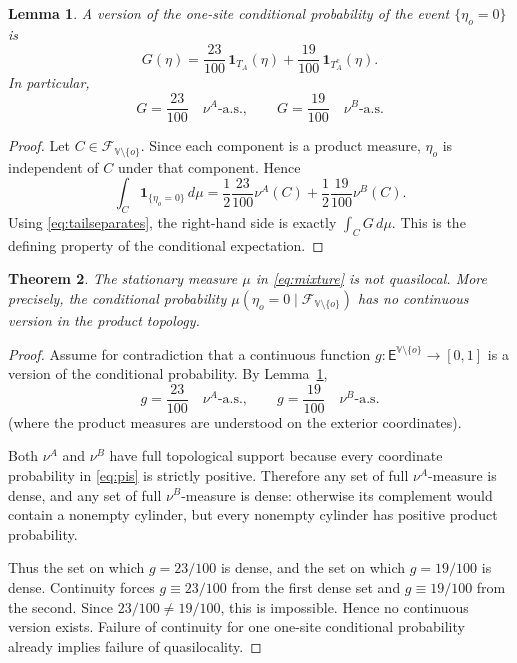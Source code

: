 \documentclass[11pt]{article}
\newtheorem{theorem}{Theorem}
\newtheorem{lemma}[theorem]{Lemma}
\newcommand{\EE}{\mathsf E}
\newcommand{\V}{\mathbb V}
\newcommand{\F}{\mathcal F}
\newcommand{\nuA}{\nu^{A}}
\newcommand{\nuB}{\nu^{B}}
\begin{document}
\begin{lemma}\label{lem:conditional}
A version of the one-site conditional probability of the event $\{\eta_o=0\}$
is
\begin{equation}
 G(\eta)
 =\frac{23}{100}\,\mathbf 1_{T_A}(\eta)
 +\frac{19}{100}\,\mathbf 1_{T_A^c}(\eta).
 \label{eq:conditional}
\end{equation}
In particular,
\[
 G=\frac{23}{100}\quad\nuA\text{-a.s.},
 \qquad
 G=\frac{19}{100}\quad\nuB\text{-a.s.}
\]
\end{lemma}

\begin{proof}
Let $C\in\F_{\V\setminus\{o\}}$.  Since each component is a product measure,
$\eta_o$ is independent of $C$ under that component.  Hence
\[
 \int_C\mathbf 1_{\{\eta_o=0\}}\,d\mu
 =\frac12\frac{23}{100}\nuA(C)
  +\frac12\frac{19}{100}\nuB(C).
\]
Using \eqref{eq:tailseparates}, the right-hand side is exactly
$\int_C G\,d\mu$.  This is the defining property of the conditional
expectation.
\end{proof}

\begin{theorem}\label{thm:nonquasi}
The stationary measure $\mu$ in \eqref{eq:mixture} is not quasilocal.  More
precisely, the conditional probability
$\mu(\eta_o=0\mid\F_{\V\setminus\{o\}})$ has no continuous version in the
product topology.
\end{theorem}

\begin{proof}
Assume for contradiction that a continuous function
$g:\EE^{\V\setminus\{o\}}\to[0,1]$ is a version of the conditional
probability.  By Lemma~\ref{lem:conditional},
\begin{equation}
 g=\frac{23}{100}\quad\nuA\text{-a.s.},
 \qquad
 g=\frac{19}{100}\quad\nuB\text{-a.s.}
 \label{eq:two-values}
\end{equation}
(where the product measures are understood on the exterior coordinates).

Both $\nuA$ and $\nuB$ have full topological support because every coordinate
probability in \eqref{eq:pis} is strictly positive.  Therefore any set of full
$\nuA$-measure is dense, and any set of full $\nuB$-measure is dense: otherwise
its complement would contain a nonempty cylinder, but every nonempty cylinder
has positive product probability.

Thus the set on which $g=23/100$ is dense, and the set on which $g=19/100$ is
dense.  Continuity forces $g\equiv23/100$ from the first dense set and
$g\equiv19/100$ from the second.  Since $23/100\ne19/100$, this is impossible.
Hence no continuous version exists.  Failure of continuity for one one-site
conditional probability already implies failure of quasilocality.
\end{proof}
\end{document}
